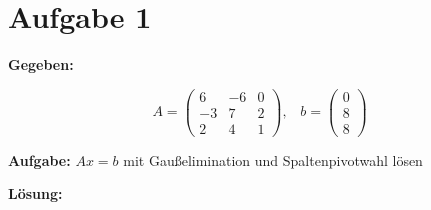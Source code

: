 \section*{Aufgabe 1}
\textbf{Gegeben:}

\[A = 
\begin{pmatrix}
    6 & -6 & 0 \\
   -3 & 7  & 2  \\
    2 & 4  & 1
\end{pmatrix}, \;\;\;
b =\begin{pmatrix}
    0 \\
    8 \\
    8
\end{pmatrix}\]

\textbf{Aufgabe:} $Ax = b$ mit Gaußelimination und Spaltenpivotwahl lösen

\textbf{Lösung:} 

